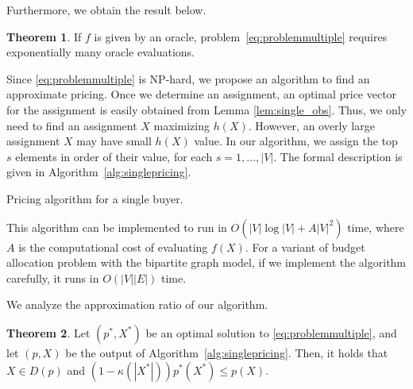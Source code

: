 \documentclass[letterpaper]{article}
\theoremstyle{definition}
\newtheorem{theorem}{Theorem}
\begin{document}
Furthermore, we obtain the result below.
\begin{theorem}
\label{thm:exporacle}
If $f$ is given by an oracle, problem~\eqref{eq:problemmultiple} requires exponentially many oracle evaluations.
\end{theorem}

Since \eqref{eq:problemmultiple} is NP-hard, we propose an algorithm to find an approximate pricing.
Once we determine an assignment, an optimal price vector for the assignment is easily obtained from Lemma \ref{lem:single_obs}.
Thus, we only need to find an assignment $X$ maximizing $h(X)$.
However, an overly large assignment $X$ may have small $h(X)$ value.
In our algorithm, we assign the top $s$ elements in order of their value, for each $s =1, \ldots, |V|$.
The formal description is given in Algorithm~\ref{alg:singlepricing}.
\begin{algorithm}[tb]
\caption{Pricing algorithm for a single buyer.}
\label{alg:singlepricing}
\begin{algorithmic}
\end{algorithmic}
\end{algorithm}

This algorithm can be implemented to run in $O(|V| \log |V| + A |V|^2)$ time,
where $A$ is the computational cost of evaluating $f(X)$.
For a variant of budget allocation problem with the bipartite graph model,
if we implement the algorithm carefully, it runs in $O(|V| |E|)$ time.

We analyze the approximation ratio of our algorithm.
\begin{theorem}
\label{thm:singlepricing}
Let $(p^*, X^*)$ be an optimal solution to \eqref{eq:problemmultiple}, and let $(p, X)$ be the output of Algorithm~\ref{alg:singlepricing}.
Then, it holds that $X \in D(p)$ and \((1 - \kappa(|X^*|)) p^*(X^*) \le p(X)\).
\end{theorem}
\end{document}

